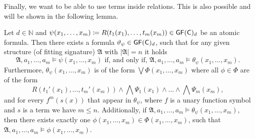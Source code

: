 Finally, we want to be able to use terms inside relations.
This is also possible and will be shown in the following lemma.

\begin{lemma}
	Let $d\in\mathbb N$ and $\psi(x_1,\dots,x_m)\coloneqq R(t_1(x_1),\dots,t_m(x_m))\in \mathsf{GF}(\mathsf{C})_d$ be an atomic formula.
	Then there exists a formula $\vartheta_\psi\in\mathsf{GF}(\mathsf{C})_d$, such that for any given structure (of fitting signature) $\mathfrak A$ with $\vert\mathfrak A \vert=n$ it holds
	$$\mathfrak A,a_1,\dots,a_m\models \psi(x_1,\dots,x_m) \text{ if, and only if, } \mathfrak A,a_1,\dots,a_m\models \theta_\psi(x_1,\dots,x_m).$$
	Furthermore, $\theta_\psi(x_1,\dots,x_m)$ is of the form $\bigvee \Phi(x_1,\dots,x_m)$ where all $\phi\in\Phi$ are of the form
	$$R(t_1'(x_1),\dots,t_m'(x_m))\land \bigwedge\Psi_1(x_1)\land \dots\land\bigwedge \Psi_m(x_m),$$
	and for every $f^m(s(x))$ that appear in $\theta_\psi$, where $f$ is a unary function symbol and $s$ is a term we have $m\leq n$.
	Additionally, if $\mathfrak A,a_1,\dots,a_m\models \theta_\psi(x_1,\dots,x_m)$, then there exists exactly one $\phi(x_1,\dots,x_m)\in\Phi(x_1,\dots,x_m)$, such that $\mathfrak A,a_1,\dots,a_m\models \phi(x_1,\dots,x_m)$.
	\label{TranslationOfArbAtomics}
\end{lemma}
